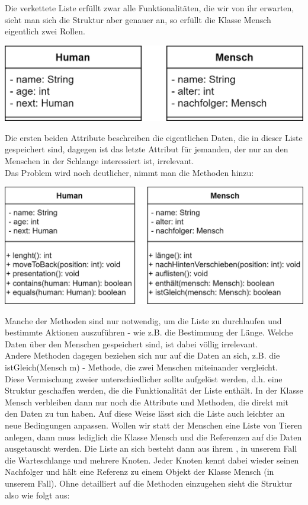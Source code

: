 \documentclass{article}
\begin{document}
Die verkettete Liste erfüllt zwar alle Funktionalitäten, die wir von ihr erwarten, sieht man sich die Struktur aber genauer an, so erfüllt die Klasse Mensch eigentlich zwei Rollen. \\
\begin{center}
    \includegraphics[scale = 0.2]{../../media/human_v2.png}
\end{center}
Die ersten beiden Attribute beschreiben die eigentlichen Daten, die in dieser Liste gespeichert sind, dagegen ist das letzte Attribut für jemanden, der nur an den Menschen in der Schlange interessiert ist, irrelevant. \\
Das Problem wird noch deutlicher, nimmt man die Methoden hinzu: 
\begin{center}
    \includegraphics[scale = 0.2]{../../media/human_v3.png}
\end{center}
Manche der Methoden sind nur notwendig, um die Liste zu durchlaufen und bestimmte Aktionen auszuführen - wie z.B. die Bestimmung der Länge. Welche Daten über den Menschen gespeichert sind, ist dabei völlig irrelevant. \\
Andere Methoden dagegen beziehen sich nur auf die Daten an sich, z.B. die istGleich(Mensch m) - Methode, die zwei Menschen miteinander vergleicht. \\
Diese Vermischung zweier unterschiedlicher sollte aufgelöst werden, d.h. eine Struktur geschaffen werden, die die Funktionalität der Liste enthält. In der Klasse Mensch verbleiben dann nur noch die Attribute und Methoden, die direkt mit den Daten zu tun haben. Auf diese Weise lässt sich die Liste auch leichter an neue Bedingungen anpassen. Wollen wir statt der Menschen eine Liste von Tieren anlegen, dann muss lediglich die Klasse Mensch und die Referenzen auf die Daten ausgetauscht werden. Die Liste an sich besteht dann aus ihrem , in unserem Fall die Warteschlange und mehrere Knoten. Jeder Knoten kennt dabei wieder seinen Nachfolger und hält eine Referenz zu einem Objekt der Klasse Mensch (in unserem Fall). Ohne detailliert auf die Methoden einzugehen sieht die Struktur also wie folgt aus: 
\end{document}
